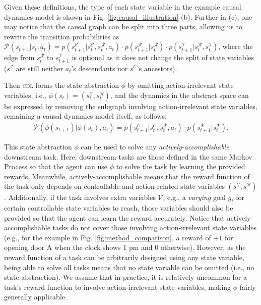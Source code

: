 Given these definitions, the type of each state variable in the example causal dynamics model is shown in Fig. \ref{fig:causal_illustration} (b). Further in (c), one may notice that the causal graph can be split into three parts, allowing us to rewrite the transition probabilities as $\mathcal{P}(s_{t+1} | s_{t}, a_t)= p(s^\mathcal{C}_{t+1} | s^\mathcal{C}_{t}, s^\mathcal{R}_{t}, a_t) \cdot p(s^\mathcal{R}_{t+1} | s^\mathcal{R}_{t}) \cdot p(s^\mathcal{I}_{t+1} | s^\mathcal{R}_{t}, s^\mathcal{I}_{t})$,
where the edge from $s^\mathcal{R}_{t}$ to $s^\mathcal{I}_{t+1}$ is optional as it does not change the split of state variables ($s^\mathcal{I}$ are still neither $a_t$'s descendants nor $s^\mathcal{C}$'s ancestors).

Then \textsc{cdl} forms the state abstraction $\phi$ by omitting action-irrelevant state variables, i.e., $\phi(s_t) = (s^\mathcal{C}_t, s^\mathcal{R}_t)$, and the dynamics in the abstract space can be expressed by removing the subgraph involving action-irrelevant state variables, remaining a causal dynamics model itself, as follows:
\begin{align}
    \mathcal{P}(\phi(s_{t+1}) | \phi(s_t), a_t) = p(s^\mathcal{C}_{t+1} | s^\mathcal{C}_{t}, s^\mathcal{R}_{t}, a_t) \cdot p(s^\mathcal{R}_{t+1} | s^\mathcal{R}_{t}). \nonumber
\end{align}

This state abstraction $\phi$ can be used to solve any \textit{actively-accomplishable} downstream task.
Here, downstream tasks are those defined in the same Markov Process so that the agent can use $\phi$ to solve the task by learning the provided rewards.
Meanwhile, actively-accomplishable means that the reward function of the task only depends on controllable and action-related state variables $(s^\mathcal{C}, s^\mathcal{R})$.
Additionally, if the task involves extra variables $\mathcal{V}$, e.g., a \textit{varying} goal $g_t$ for certain controllable state variables to reach, those variables should also be provided so that the agent can learn the reward accurately.
Notice that actively-accomplishable tasks do not cover those involving action-irrelevant state variables (e.g., for the example in Fig. \ref{fig:method_comparison}, a reward of $+1$ for opening door A when the clock shows 1 pm and $0$ otherwise).
However, as the reward function of a task can be arbitrarily designed using any state variable, being able to solve all tasks means that no state variable can be omitted (i.e., no state abstraction). We assume that in practice, it is relatively uncommon for a task’s reward function to involve action-irrelevant state variables, making $\phi$ fairly generally applicable.

